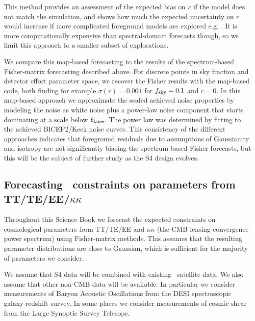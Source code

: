 This method provides an assessment of the expected bias on $r$ if the model does not match the simulation, and shows how much the expected uncertainty on $r$ would increase if more complicated foreground models are explored e.g. \cite{ArmitageCaplan:2011sn,Remazeilles:2015hpa}. It is more computationally expensive than spectral-domain forecasts though, so we limit this approach to a smaller subset of explorations. 

We compare this map-based forecasting to the results of the spectrum-based Fisher-matrix 
forecasting described above. For discrete points in sky fraction and detector effort parameter space, 
we recover the Fisher results with the map-based code, both finding for example $\sigma(r)=0.001$ for $f_{\rm sky}=0.1$ and $r=0$. In this map-based approach we approximate the scaled achieved noise properties by modeling the noise as white noise plus a power-law noise component that starts dominating at a scale below $\ell_{\rm knee}$. The power law was determined by fitting to the achieved BICEP2/Keck noise curves.  This consistency of the different approaches indicates that foreground residuals due to assumptions of Gaussianity and isotropy are not significantly biasing the spectrum-based Fisher forecasts, but this will be the subject of further study as the S4 design evolves.

\subsection{Forecasting \cmbexp\ constraints on parameters from TT/TE/EE/$\kappa\kappa$}
\label{sec:ttee}

Throughout this Science Book we forecast the expected constraints on cosmological parameters from TT/TE/EE and $\kappa\kappa$ (the CMB lensing convergence power spectrum) using Fisher-matrix methods. This assumes that the resulting parameter distributions are close to Gaussian, which is sufficient for the majority of parameters we consider.

We assume that S4 data will be combined with existing \planck\ satellite data. We also assume that other non-CMB data will be available. In particular we consider measurements of Baryon Acoustic Oscillations from the DESI spectroscopic galaxy redshift survey. In some places we consider measurements of cosmic shear from the Large Synoptic Survey Telesope.


